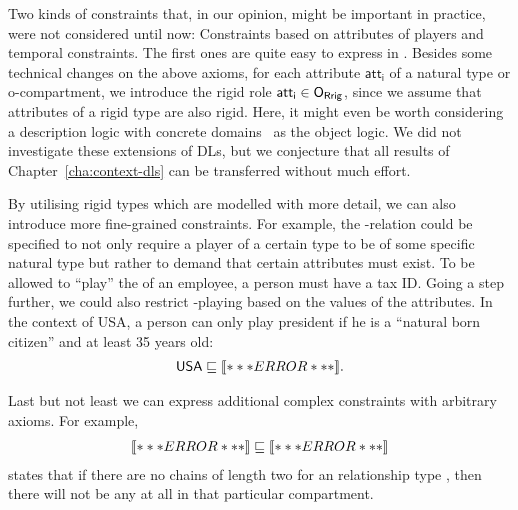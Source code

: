 
Two kinds of constraints that, in our opinion, might be important in practice, were not considered
until now: Constraints based on attributes of players and temporal constraints.
%
The first ones are quite easy to express in \LMLO. Besides some technical changes on the above
axioms, for each attribute $\mathsf{att_{i}}$ of a natural type or o-compartment, we introduce the
rigid role $\mathsf{att_{i}}\in\ORR$, since we assume that attributes of a rigid type are also
rigid.  Here, it might even be worth considering a description logic with concrete
domains~\cite{Lutz-PHD02,Lut-AiML02} as the object logic. We did not investigate these extensions of
DLs, but we conjecture that all results of Chapter~\ref{cha:context-dls} can be transferred without
much effort.

By utilising rigid types which are modelled with more detail, we can also introduce more fine-grained
constraints. For example, the \fills-relation could be specified to not only require a player of a
certain \rosirole type to be of some specific natural type but rather to demand that certain
attributes must exist. To be allowed to ``play'' the \rosirole of an employee, a person must have a
tax ID. Going a step further, we could also restrict \rosirole-playing based on the values of the
attributes. In the context of USA, a person can only play president if he is a ``natural born
citizen'' and at least 35 years old:
\begin{align*}
  \mathsf{USA} \sqsubseteq\oax{\exists\plays.\mathsf{President} \sqsubseteq \mathsf{Person} \sqcap
  \exists \mathsf{natural\_born\_citizen}.\{\true\} \sqcap \exists\mathsf{age \geq_{35}}}.
\end{align*}

Last but not least we can express additional complex constraints with arbitrary \LMLO axioms. For
example,
\begin{align*}
  \oax{\exists\rst.(\exists\rst.\top)\sqsubseteq\bot} \sqsubseteq \oax{\exists\rst.\top\sqsubseteq\bot}
\end{align*}
states that if there are no chains of length two for an relationship type \rst, then there will not
be any \rst at all in that particular compartment.


